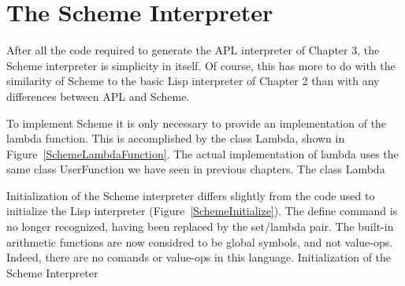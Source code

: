 \chapter{The Scheme Interpreter}

After all the code required to generate the APL interpreter of Chapter 3, the
Scheme interpreter is simplicity in itself.  Of course, this has more to do with
the similarity of Scheme to the basic Lisp interpreter of Chapter 2 than with
any differences between APL and Scheme.

To implement Scheme it is only necessary to provide an implementation of the
lambda function.  This is accomplished by the class {\sf Lambda}, shown in
Figure~\ref{SchemeLambdaFunction}.  The actual implementation of lambda uses the
same class {\sf UserFunction} we have seen in previous chapters.
%
{The class Lambda}

Initialization of the Scheme interpreter differs slightly from the code used to
initialize the Lisp interpreter (Figure~\ref{SchemeInitialize}).  The {\sf
    define} command is no longer recognized, having been replaced by the {\sf
    set}/{\sf lambda} pair.  The built-in arithmetic functions are now considred
to be global symbols, and not value-ops.  Indeed, there are no comands or
value-ops in this language.
%
{Initialization of the Scheme Interpreter}

